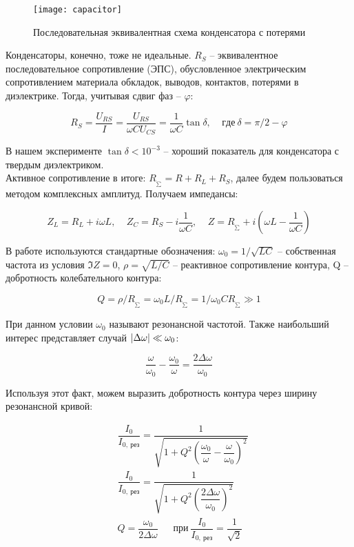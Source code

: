 \documentclass{lab}
\newcommand{\R}{R_{_{\sum}}}
\begin{document}
\begin{wrapfigure}[10]{l}{5cm}
	\vspace{-0.5cm}
	\texttt{[image: capacitor]}
	\caption{\footnotesize
	Последовательная эквивалентная схема конденсатора с потерями
	}
	\label{capacitor}
\end{wrapfigure}

Конденсаторы, конечно, тоже не идеальные. $ R_S $ -- эквивалентное последовательное
сопротивление (ЭПС), обусловленное электрическим сопротивлением материала обкладок,
выводов, контактов, потерями в диэлектрике. Тогда, учитывая сдвиг фаз -- $ \varphi $:

$$ R_S = \dfrac{U_{RS}}{I} = \dfrac{U_{RS}}{\omega CU_{CS}} = \dfrac{1}{\omega C}
\tan \delta, ~~~~~ где ~ \delta = \pi / 2 - \varphi $$

В нашем эксперименте $ \tan \delta < 10^{-3} $ -- хороший показатель для конденсатора
с твердым диэлектриком.\\

Активное сопротивление в итоге: $ \R = R + R_L + R_S $, далее будем пользоваться
методом комплексных амплитуд. Получаем импедансы:

$$ Z_L = R_L + i \omega L, ~~~~~ Z_C = R_S - i\dfrac{1}{\omega C}, ~~~~~ Z = \R +
i \left(\omega L - \dfrac{1}{\omega C}\right) $$ 

В работе используются стандартные обозначения: $ \omega_0 = 1/\sqrt{LC} $ -- собственная
частота из условия $ \Im Z = 0 $, $ \rho = \sqrt{L/C} $ -- реактивное сопротивление
контура, Q -- добротность колебательного контура:

$$ Q = \rho / \R = \omega_0 L / \R = 1 / \omega_0 C \R \gg 1 $$

При данном условии $ \omega_0 $ называют резонансной частотой. Также наибольший интерес
представляет случай $ \left| \Delta \omega \right| \ll \omega_0 $:

$$ \dfrac{\omega}{\omega_0} - \dfrac{\omega_0}{\omega} = \dfrac{2\Delta\omega}{\omega_0} $$

Используя этот факт, можем выразить добротность контура через ширину резонансной кривой:

\begin{equation}
\begin{aligned}
&\dfrac{I_0}{I_{0,~рез}} = \dfrac{1}{\sqrt{1 + Q^2 \left(\dfrac{\omega_0}{\omega} -
		\dfrac{\omega}{\omega_0}\right)^2}}\\
&\dfrac{I_0}{I_{0,~рез}} = \dfrac{1}{\sqrt{1 +
		Q^2 \left(\dfrac{2\Delta\omega}{\omega_0}\right)^2}}\\
&Q = \dfrac{\omega_0}{2\Delta\omega} ~~~~~~~ при ~ \dfrac{I_0}{I_{0,~рез}} =
		\dfrac{1}{\sqrt{2}}
\end{aligned}
\end{equation}
\end{document}
